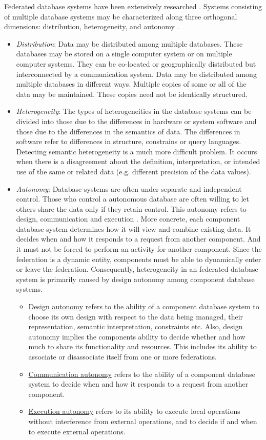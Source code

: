 \documentclass[12pt,a4paper]{report}
\newcommand{\term}{\textit}
\newcommand{\sub}{\underline}
\begin{document}
	Federated database systems have been extensively researched \citep{Sheth, Litwin}.
	Systems consisting of multiple database systems may be characterized along three orthogonal dimensions: distribution, heterogeneity, and autonomy \citep{Sheth}. 
	\begin{itemize}
		\item \term{Distribution}: Data may be distributed among multiple databases. These databases may be stored on a single computer system or on multiple computer systems. They can be co-located or geographically distributed but interconnected by a communication system. Data may be distributed among multiple databases in different ways. Multiple copies of some or all of the data may be maintained. These copies need not be identically structured.
		\item \term{Heterogeneity}: The types of heterogeneities in the database systems can be divided into those due to the differences in hardware or system software and those due to the differences in the semantics of data. The differences in software refer to differences in structure, constrains or query languages. Detecting semantic heterogeneity is a much more difficult problem. It occurs when there is a disagreement about the definition, interpretation, or intended use of the same or related data (e.g. different precision of the data values). 
		\item \term{Autonomy}: Database systems are often under separate and independent control. Those who control a autonomous database are often willing to let others share the data only if they retain control. This autonomy refers to design, communication and execution \citep{Sheth, Heimbigner}. More concrete, each component database system determines how it will view and combine existing data. It decides when and how it responds to a request from another component. And it must not be forced to perform an activity for another component. Since the federation is a dynamic entity, components must be able to dynamically enter or leave the federation. Consequently, heterogeneity in an federated database system is primarily caused by design autonomy among component database systems. 
		
		\begin{itemize}
			\item \sub{Design autonomy} refers to the ability of a component database system to choose its own design with respect to the data being managed, their representation, semantic interpretation, constraints etc. Also, design autonomy implies the components ability to decide whether and how much to share its functionality and resources. This includes its ability to associate or disassociate itself from one or more federations. 
			\item \sub{Communication autonomy} refers to the ability of a component database system to decide when and how it responds to a request from another component. 
			\item \sub{Execution autonomy} refers to its ability to execute local operations without interference from external operations, and to decide if and when to execute external operations. 
		\end{itemize}
	\end{itemize} 
	
\end{document}
